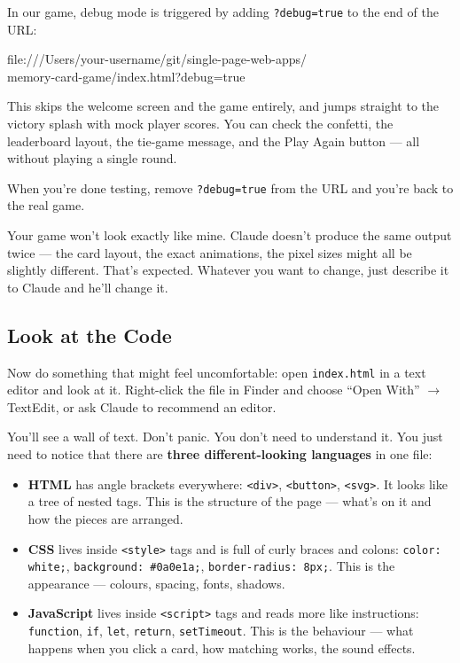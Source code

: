 \documentclass[11pt,a4paper]{article}
\begin{document}
In our game, debug mode is triggered by adding \texttt{?debug=true} to the end of the URL:

\begin{tcolorbox}[termbox]
file:///Users/your-username/git/single-page-web-apps/\\
\quad memory-card-game/index.html?debug=true
\end{tcolorbox}

This skips the welcome screen and the game entirely, and jumps straight to the victory splash with mock player scores. You can check the confetti, the leaderboard layout, the tie-game message, and the Play Again button --- all without playing a single round.

When you're done testing, remove \texttt{?debug=true} from the URL and you're back to the real game.

Your game won't look exactly like mine. Claude doesn't produce the same output twice --- the card layout, the exact animations, the pixel sizes might all be slightly different. That's expected. Whatever you want to change, just describe it to Claude and he'll change it.

\subsection{Look at the Code}

Now do something that might feel uncomfortable: open \texttt{index.html} in a text editor and look at it. Right-click the file in Finder and choose ``Open With'' \(\rightarrow\) TextEdit, or ask Claude to recommend an editor.

You'll see a wall of text. Don't panic. You don't need to understand it. You just need to notice that there are \textbf{three different-looking languages} in one file:

\begin{itemize}[leftmargin=1.5em]
  \item \textbf{HTML} has angle brackets everywhere: \texttt{<div>}, \texttt{<button>}, \texttt{<svg>}. It looks like a tree of nested tags. This is the structure of the page --- what's on it and how the pieces are arranged.
  \item \textbf{CSS} lives inside \texttt{<style>} tags and is full of curly braces and colons: \texttt{color: white;}, \texttt{background: \#0a0e1a;}, \texttt{border-radius: 8px;}. This is the appearance --- colours, spacing, fonts, shadows.
  \item \textbf{JavaScript} lives inside \texttt{<script>} tags and reads more like instructions: \texttt{function}, \texttt{if}, \texttt{let}, \texttt{return}, \texttt{setTimeout}. This is the behaviour --- what happens when you click a card, how matching works, the sound effects.
\end{itemize}
\end{document}
